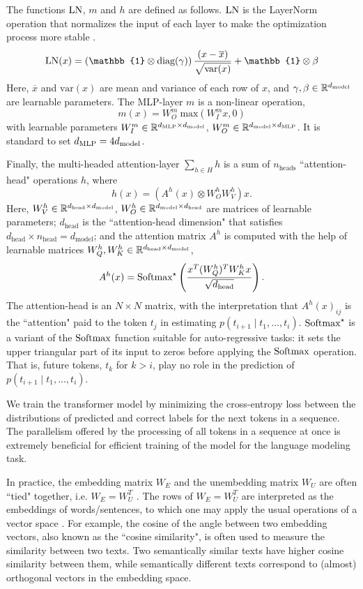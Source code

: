 The functions $\text{LN}$, $m$ and $h$ are defined as follows.
$\text{LN}$ is the LayerNorm operation that normalizes the input of each layer to make the optimization process more stable \cite{ba2016layer}.
\[
\LN(x) = \left(\mathbb{1} \otimes \text{diag}(\gamma) \right) \frac{(x-\overline{x})}{\sqrt{\text{var}(x)}} + \mathbb{1} \otimes \beta
\]
Here, $\overline{x}$ and $\text{var}(x)$ are mean and variance of each row of $x$, and $\gamma, \beta \in \mathbb{R}^{d_{\text{model}}}$ are learnable parameters.
The MLP-layer $m$ is a non-linear operation,
\[
m(x) =W^m_O \ \text{max}(W_I^m x, 0)
\]
with learnable parameters $W^m_I \in \mathbb{R}^{d_{\text{MLP}} \times d_{\text{model}}}$, $W^m_O \in \mathbb{R}^{d_{\text{model}} \times d_{\text{MLP}}}$.
It is standard to set $d_{\text{MLP}} = 4 d_{\text{model}}$.

Finally, the multi-headed attention-layer $\sum_{h \in H} h$ is a sum of $n_{\text{heads}}$ ``attention-head" operations $h$, where
\[
h(x) = (A^h(x) \otimes W^h_O W^h_V) x.
\]
Here, $W^h_V \in \mathbb{R}^{d_{\text{head}} \times d_{\text{model}}}$,
$W^h_O \in \mathbb{R}^{d_{\text{model}} \times d_{\text{head}}}$
are matrices of learnable parameters;
$d_{\text{head}}$ is the ``attention-head dimension" that satisfies $d_{\text{head}} \times n_{\text{head}} = d_{\text{model}}$; and the attention matrix $A^h$ is computed with the help of learnable matrices
$W^h_Q, W^h_K \in \mathbb{R}^{d_{\text{head}} \times d_{\text{model}}}$,
\[
A^h(x) = \text{Softmax}^\star \left(\frac{x^T (W^h_Q)^T W^h_K x}{\sqrt{d_{\text{head}}}}\right).
\]
The attention-head is an $N \times N$ matrix, with the interpretation that $A^h(x)_{ij}$
is the ``attention" paid to the token
$t_j$ in estimating
$p(t_{i+1} \mid t_1, \dots, t_i)$.
$\text{Softmax}^\star$ is a variant of the $\text{Softmax}$ function suitable for auto-regressive tasks: it sets the upper triangular part of its input to zeros before applying the
$\text{Softmax}$ operation.
That is, future tokens, $t_k$ for $k > i$, play no role in the prediction of $p(t_{i+1} \mid t_1, \dots, t_i)$.

We train the transformer model by minimizing the cross-entropy loss between the distributions of predicted and correct labels for the next tokens in a sequence.
The parallelism offered by the processing of all tokens in a sequence at once is extremely beneficial for efficient training of the model for the language modeling task.

In practice, the embedding matrix $W_E$ and the unembedding matrix $W_U$ are often ``tied" together, i.e. $W_E = W_U^T$ \cite{press2017using, inan2017tying}.
The rows of $W_E = W_U^T$ are interpreted as the embeddings of words/sentences, to which one may apply the usual operations of a vector space \cite{Bengio:2003, mikolov-etal-2013-linguistic}.
For example, the cosine of the angle between two embedding vectors, also known as the ``cosine similarity", is often used to measure the similarity between two texts.
Two semantically similar texts have higher cosine similarity between them, while semantically different texts correspond to (almost) orthogonal vectors in the embedding space.

